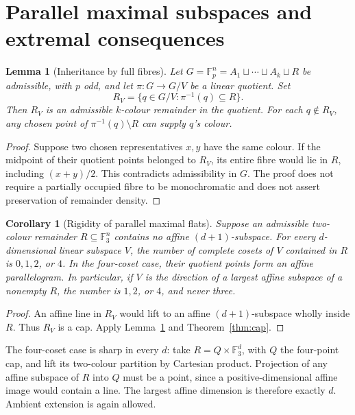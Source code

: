 \documentclass[11pt]{article}
\newtheorem{lemma}[theorem]{Lemma}
\newtheorem{corollary}[theorem]{Corollary}
\theoremstyle{remark}
\newcommand{\F}{\mathbb F_3}
\newcommand{\Fp}{\mathbb F_p}
\begin{document}
\section{Parallel maximal subspaces and extremal consequences}

\begin{lemma}[Inheritance by full fibres]\label{lem:fibre}
Let $G=\Fp^n=A_1\sqcup\cdots\sqcup A_k\sqcup R$ be admissible, with $p$
odd, and let $\pi:G\to G/V$ be a linear quotient. Set
\[
 R_V=\{q\in G/V:\pi^{-1}(q)\subseteq R\}.
\]
Then $R_V$ is an admissible $k$-colour remainder in the quotient. For each
$q\notin R_V$, any chosen point of $\pi^{-1}(q)\setminus R$ can supply
$q$'s colour.
\end{lemma}
\begin{proof}
Suppose two chosen representatives $x,y$ have the same colour. If the
midpoint of their quotient points belonged to $R_V$, its entire fibre
would lie in $R$, including $(x+y)/2$. This contradicts admissibility in
$G$. The proof does not require a partially occupied fibre to be
monochromatic and does not assert preservation of remainder density.
\end{proof}

\begin{corollary}[Rigidity of parallel maximal flats]\label{cor:parallel}
Suppose an admissible two-colour remainder $R\subseteq\F^n$ contains no
affine $(d+1)$-subspace. For every $d$-dimensional linear subspace $V$, the
number of complete cosets of $V$ contained in $R$ is $0,1,2$, or $4$.
In the four-coset case, their quotient points form an affine parallelogram.
In particular, if $V$ is the direction of a largest affine subspace of a
nonempty $R$, the number is $1,2$, or $4$, and never three.
\end{corollary}
\begin{proof}
An affine line in $R_V$ would lift to an affine $(d+1)$-subspace wholly
inside $R$. Thus $R_V$ is a cap. Apply Lemma~\ref{lem:fibre} and
Theorem~\ref{thm:cap}.
\end{proof}
The four-coset case is sharp in every $d$: take
$R=Q\times\F^d$, with $Q$ the four-point cap, and lift its two-colour
partition by Cartesian product. Projection of any affine subspace of $R$
into $Q$ must be a point, since a positive-dimensional affine image would
contain a line. The largest affine dimension is therefore exactly $d$.
Ambient extension is again allowed.
\end{document}
